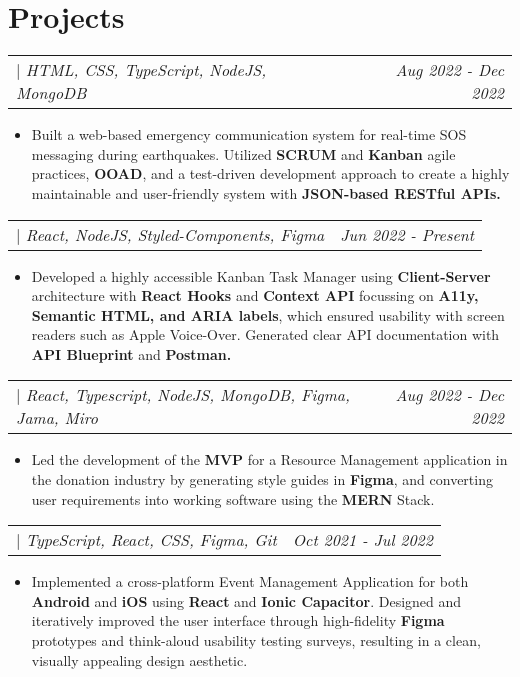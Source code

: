\documentclass[letterpaper]{article}
\makeatletter
\newcommand{\resumeItemWithoutTitle}[1]{
  \item\small{
    {#1 \vspace{-2pt}}
  }
}
\newcommand{\shortSection}[1]{
    \vspace{-6pt}
    \section{#1}
}
\newcommand{\projectHeading}[3]{
  \begin{tabular*}{\textwidth}{l@{\extracolsep{\fill}}r}
        \textbf{#1} 
        \hspace{-2pt} $\vert$ \hspace{-2pt} \small{\textit{#2}} 
        & 
        \textit{#3} \\
    \end{tabular*}\vspace{-2pt}
}
\newcommand{\resumeItemListStart}{\begin{itemize}}
\newcommand{\resumeItemListEnd}{\end{itemize}}
\makeatother
\begin{document}



\shortSection{Projects}
\vspace{3pt}
\projectHeading {\href{https://esn.onrender.com}{\color{blue}{Emergency Social Network}}}{HTML, CSS, TypeScript, NodeJS, MongoDB}{Aug 2022 - Dec 2022}
\resumeItemListStart
\resumeItemWithoutTitle{Built a web-based emergency communication system for real-time SOS messaging during earthquakes. Utilized \textbf{SCRUM} and \textbf{Kanban} agile practices, \textbf{OOAD}, and a test-driven development approach to create a highly maintainable and user-friendly system with \textbf{JSON-based RESTful APIs.}}
\resumeItemListEnd


\projectHeading {\href{https://kanbhan.netlify.app}{\color{blue}{Kanban Task Manager}}}{React, NodeJS, Styled-Components, Figma}{Jun 2022 - Present}
\resumeItemListStart
\resumeItemWithoutTitle{Developed a highly accessible Kanban Task Manager using \textbf{Client-Server} architecture with \textbf{React Hooks} and \textbf{Context API} focussing on \textbf{A11y, Semantic HTML, and ARIA labels}, which ensured usability with screen readers such as Apple Voice-Over. Generated clear API documentation with \textbf{API Blueprint} and \textbf{Postman.}}
\resumeItemListEnd


\vspace{3pt}
\projectHeading {\href{https://mailchi.mp/6cf20f3d592f/reuse}{\color{blue}{Re:use}}}{React, Typescript, NodeJS, MongoDB, Figma, Jama, Miro}{Aug 2022 - Dec 2022}
\resumeItemListStart
\resumeItemWithoutTitle{Led the development of the \textbf{MVP} for a Resource Management application in the donation industry by generating style guides in \textbf{Figma}, and converting user requirements into working software using the \textbf{MERN} Stack.}
\resumeItemListEnd

\vspace{3pt}
\projectHeading {\href{https://www.figma.com/file/FpWVddCZKdJz5V7ADe4eb5/Refriendo}{\color{blue}{Refriendo}}}{TypeScript, React, CSS, Figma, Git}{Oct 2021 - Jul 2022}
\resumeItemListStart
\resumeItemWithoutTitle{Implemented a cross-platform Event Management Application for both \textbf{Android} and \textbf{iOS} using \textbf{React} and \textbf{Ionic Capacitor}. Designed and iteratively improved the user interface through high-fidelity \textbf{Figma} prototypes and think-aloud usability testing surveys, resulting in a clean, visually appealing design aesthetic.}
\resumeItemListEnd
\end{document}
